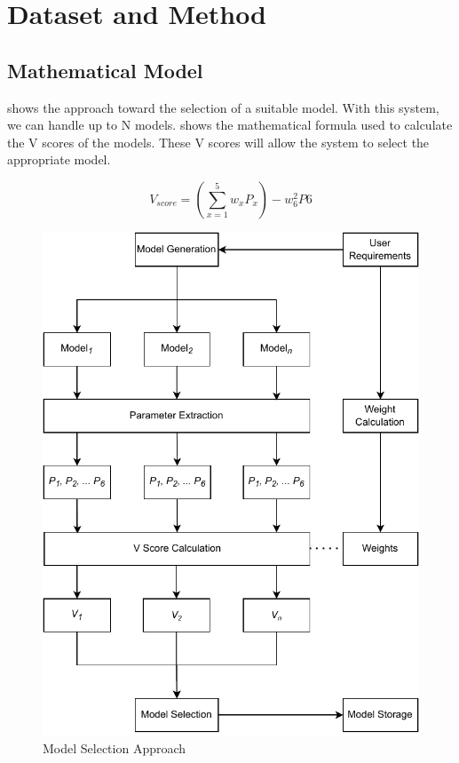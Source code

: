 \section{Dataset and Method} \label{sec:dataset_and_method}

\subsection{Mathematical Model}\label{subsec:mathematical_model}

 shows the approach toward the selection of a suitable model. With this system, we can handle up to N models.  shows the mathematical formula used to calculate the V scores of the models. These V scores will allow the system to select the appropriate model.

\begin{equation}\label{eq:v_score}
    V_{score} = \left(\sum_{x=1}^{5} w_xP_x\right) - w_6^2P6
\end{equation}

\begin{figure}
    \centering
    \includegraphics[width=1.2\columnwidth]{media/ch_dataset_and_methods/math_model_relaxed.pdf}
    \caption{Model Selection Approach}
    \label{fig:model_selection_approach}
\end{figure}

